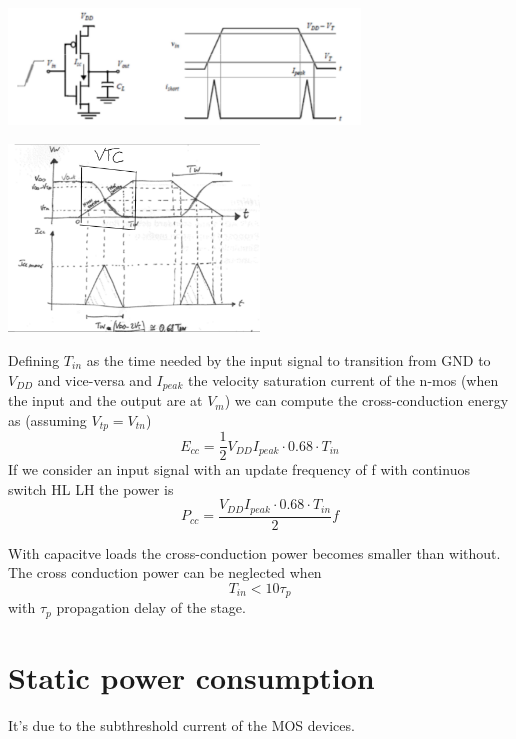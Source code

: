 \centering
\includegraphics[width=0.7\textwidth]{C4_1.png}\\
\raggedright

\centering
\includegraphics[width=0.5\textwidth]{C4_1b.png}\\
\raggedright

Defining $T_{in}$ as the time needed by the input signal to transition from GND to $V_{DD}$ and vice-versa and $I_{peak}$ the velocity saturation current of the n-mos (when the input and the output are at $V_m$) we can compute the cross-conduction energy as (assuming $V_{tp}=V_{tn}$) 
\begin{equation}
E_{cc}= \frac{1}{2} V_{DD}I_{peak}\cdot 0.68 \cdot T_{in}
\end{equation}
If we consider an input signal with an update frequency of f with continuos switch HL LH the power is 
\begin{equation}
P_{cc}=\frac{V_{DD}I_{peak} \cdot 0.68 \cdot T_{in}}{2} f
\end{equation}

\vspace{5mm}

With capacitve loads the cross-conduction power becomes smaller than without.\\ 
The cross conduction power can be neglected when 
\begin{equation}
T_{in}<10\tau_p
\end{equation}
with $\tau_p$ propagation delay of the stage.\\


\section{Static power consumption}
It's due to the subthreshold current of the MOS devices.

